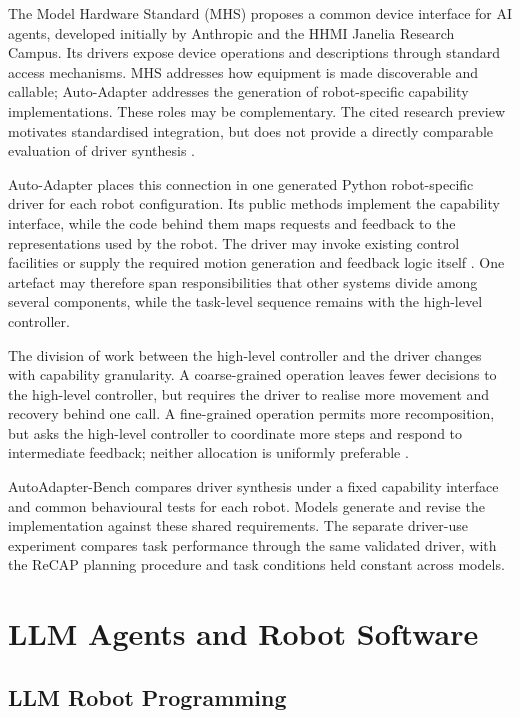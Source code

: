 The Model Hardware Standard (MHS) proposes a common device interface for AI
agents, developed initially by Anthropic and the HHMI Janelia Research Campus.
Its drivers expose device operations and descriptions through standard access
mechanisms. MHS addresses how equipment is made discoverable and callable;
Auto-Adapter addresses the generation of robot-specific capability
implementations. These roles may be complementary. The cited research preview
motivates standardised integration, but does not provide a directly comparable
evaluation of driver synthesis
\citep{anthropic2026mhs}.

Auto-Adapter places this connection in one generated Python robot-specific
driver for each robot configuration. Its public methods implement the
capability interface, while the code behind them maps requests and feedback to
the representations used by the robot. The driver may invoke existing control
facilities or supply the required motion generation and feedback logic itself
\citep{lynch2017modern}. One artefact may therefore span responsibilities that
other systems divide among several components, while the task-level sequence
remains with the high-level controller.

The division of work between the high-level controller and the driver changes
with capability granularity. A coarse-grained operation leaves fewer decisions
to the high-level controller, but requires the driver to realise more movement
and recovery behind one call. A fine-grained operation permits more
recomposition, but asks the high-level controller to coordinate more steps and
respond to intermediate feedback; neither allocation is uniformly preferable
\citep{zech2019action,pantano2022capabilitysurvey}.

AutoAdapter-Bench compares driver synthesis under a fixed
capability interface and common behavioural tests for each robot. Models
generate and revise the implementation against these shared requirements. The
separate driver-use experiment compares task performance through the same
validated driver, with the ReCAP planning procedure and task conditions held
constant across models.

\section{LLM Agents and Robot Software}
\label{sec:llm-agents-robot-software}

\subsection{LLM Robot Programming}
\label{sec:llm-robot-programming}

